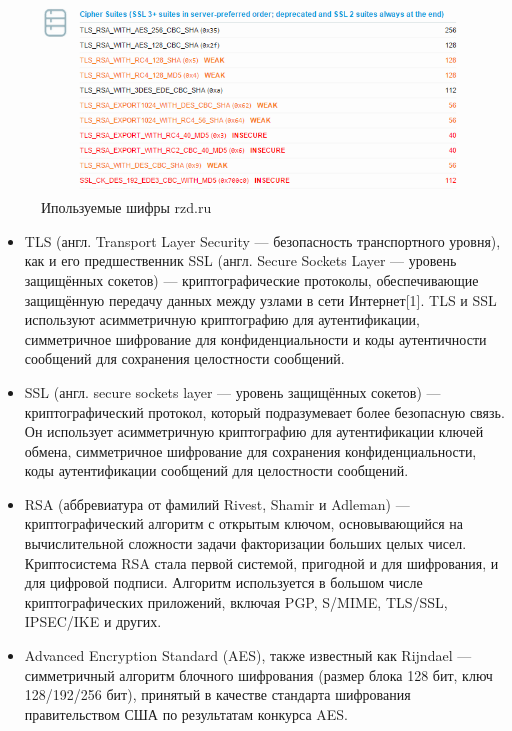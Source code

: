 \documentclass[11pt, a4paper]{article}		%
\begin{document}
\begin{figure}[h!]
\centering
\includegraphics[scale=0.8]{res/8}
\caption{Ипользуемые шифры rzd.ru}
\end{figure}

\begin{itemize}

\item TLS (англ. Transport Layer Security — безопасность транспортного уровня), как и его предшественник SSL (англ. Secure Sockets Layer — уровень защищённых сокетов) — криптографические протоколы, обеспечивающие защищённую передачу данных между узлами в сети Интернет[1]. TLS и SSL используют асимметричную криптографию для аутентификации, симметричное шифрование для конфиденциальности и коды аутентичности сообщений для сохранения целостности сообщений.

\item SSL (англ. secure sockets layer — уровень защищённых сокетов) — криптографический протокол, который подразумевает более безопасную связь. Он использует асимметричную криптографию для аутентификации ключей обмена, симметричное шифрование для сохранения конфиденциальности, коды аутентификации сообщений для целостности сообщений. 

\item RSA (аббревиатура от фамилий Rivest, Shamir и Adleman) — криптографический алгоритм с открытым ключом, основывающийся на вычислительной сложности задачи факторизации больших целых чисел. Криптосистема RSA стала первой системой, пригодной и для шифрования, и для цифровой подписи. Алгоритм используется в большом числе криптографических приложений, включая PGP, S/MIME, TLS/SSL, IPSEC/IKE и других.

\item Advanced Encryption Standard (AES), также известный как Rijndael — симметричный алгоритм блочного шифрования (размер блока 128 бит, ключ 128/192/256 бит), принятый в качестве стандарта шифрования правительством США по результатам конкурса AES. 


\end{itemize}
\end{document}
